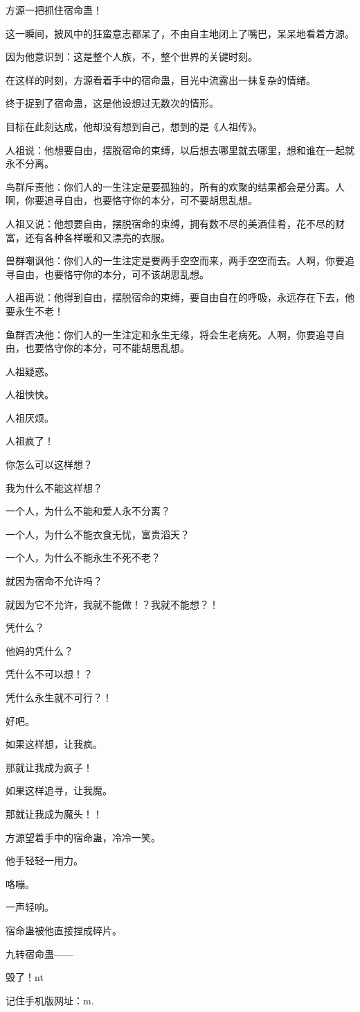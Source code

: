 \begin{this_body}
方源一把抓住宿命蛊！

这一瞬间，披风中的狂蛮意志都呆了，不由自主地闭上了嘴巴，呆呆地看着方源。

因为他意识到：这是整个人族，不，整个世界的关键时刻。

在这样的时刻，方源看着手中的宿命蛊，目光中流露出一抹复杂的情绪。

终于捉到了宿命蛊，这是他设想过无数次的情形。

目标在此刻达成，他却没有想到自己，想到的是《人祖传》。

人祖说：他想要自由，摆脱宿命的束缚，以后想去哪里就去哪里，想和谁在一起就永不分离。

鸟群斥责他：你们人的一生注定是要孤独的，所有的欢聚的结果都会是分离。人啊，你要追寻自由，也要恪守你的本分，可不要胡思乱想。

人祖又说：他想要自由，摆脱宿命的束缚，拥有数不尽的美酒佳肴，花不尽的财富，还有各种各样暖和又漂亮的衣服。

兽群嘲讽他：你们人的一生注定是要两手空空而来，两手空空而去。人啊，你要追寻自由，也要恪守你的本分，可不该胡思乱想。

人祖再说：他得到自由，摆脱宿命的束缚，要自由自在的呼吸，永远存在下去，他要永生不老！

鱼群否决他：你们人的一生注定和永生无缘，将会生老病死。人啊，你要追寻自由，也要恪守你的本分，可不能胡思乱想。

人祖疑惑。

人祖怏怏。

人祖厌烦。

人祖疯了！

你怎么可以这样想？

我为什么不能这样想？

一个人，为什么不能和爱人永不分离？

一个人，为什么不能衣食无忧，富贵滔天？

一个人，为什么不能永生不死不老？

就因为宿命不允许吗？

就因为它不允许，我就不能做！？我就不能想？！

凭什么？

他妈的凭什么？

凭什么不可以想！？

凭什么永生就不可行？！

好吧。

如果这样想，让我疯。

那就让我成为疯子！

如果这样追寻，让我魔。

那就让我成为魔头！！

方源望着手中的宿命蛊，冷冷一笑。

他手轻轻一用力。

咯嘣。

一声轻响。

宿命蛊被他直接捏成碎片。

九转宿命蛊——

毁了！nt

记住手机版网址：m.

\end{this_body}

